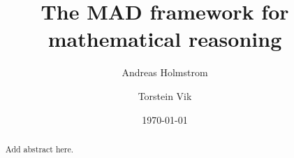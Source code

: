 
\title{The MAD framework for mathematical reasoning}

\author{Andreas Holmstrom}

\author{Torstein Vik}


\keywords{}

\date{\today}

\dedicatory{}

\begin{abstract}
Add abstract here.
\end{abstract}

\maketitle

\setcounter{tocdepth}{2}
\tableofcontents

\newpage
